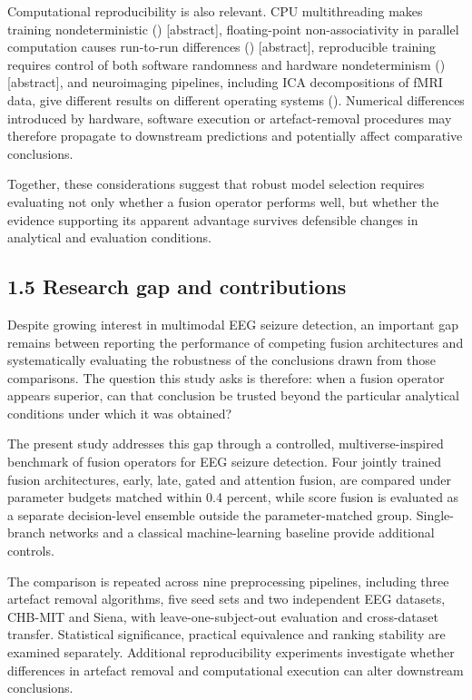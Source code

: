 \documentclass[11pt,a4paper]{article}
\begin{document}
Computational reproducibility is also relevant. CPU multithreading makes training
nondeterministic (\citealp{Xiao_2021}) {[}abstract{]}, floating-point non-associativity in
parallel computation causes run-to-run differences (\citealp{Shanmugavelu_2024}) {[}abstract{]},
reproducible training requires control of both software randomness and hardware
nondeterminism (\citealp{Chen_2022}) {[}abstract{]}, and neuroimaging pipelines, including ICA
decompositions of fMRI data, give different results on different operating systems
(\citealp{Glatard_2015}). Numerical differences introduced by hardware, software execution
or artefact-removal procedures may therefore propagate to downstream predictions and
potentially affect comparative conclusions.

Together, these considerations suggest that robust model selection requires evaluating
not only whether a fusion operator performs well, but whether the evidence supporting its
apparent advantage survives defensible changes in analytical and evaluation conditions.

\subsection{1.5 Research gap and contributions}\label{research-gap-and-contributions}

Despite growing interest in multimodal EEG seizure detection, an important gap remains
between reporting the performance of competing fusion architectures and systematically
evaluating the robustness of the conclusions drawn from those comparisons. The question
this study asks is therefore: when a fusion operator appears superior, can that
conclusion be trusted beyond the particular analytical conditions under which it was
obtained?

The present study addresses this gap through a controlled, multiverse-inspired benchmark
of fusion operators for EEG seizure detection. Four jointly trained fusion architectures,
early, late, gated and attention fusion, are compared under parameter budgets matched
within 0.4 percent, while score fusion is evaluated as a separate decision-level ensemble
outside the parameter-matched group. Single-branch networks and a classical
machine-learning baseline provide additional controls.

The comparison is repeated across nine preprocessing pipelines, including three artefact
removal algorithms, five seed sets and two independent EEG datasets, CHB-MIT and Siena,
with leave-one-subject-out evaluation and cross-dataset transfer. Statistical
significance, practical equivalence and ranking stability are examined separately.
Additional reproducibility experiments investigate whether differences in artefact
removal and computational execution can alter downstream conclusions.
\end{document}
